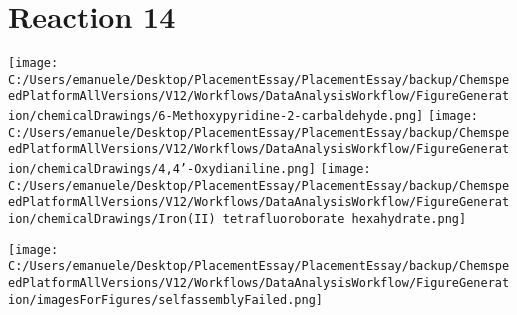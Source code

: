 \documentclass{article}%
\begin{document}
\section*{Reaction 14}%
%
\begin{scheme}[H]%
\begin{minipage}{0.5\textwidth}%
\texttt{[image: C:/Users/emanuele/Desktop/PlacementEssay/PlacementEssay/backup/ChemspeedPlatformAllVersions/V12/Workflows/DataAnalysisWorkflow/FigureGeneration/chemicalDrawings/6-Methoxypyridine-2-carbaldehyde.png]}%
\texttt{[image: C:/Users/emanuele/Desktop/PlacementEssay/PlacementEssay/backup/ChemspeedPlatformAllVersions/V12/Workflows/DataAnalysisWorkflow/FigureGeneration/chemicalDrawings/4,4'-Oxydianiline.png]}%
\texttt{[image: C:/Users/emanuele/Desktop/PlacementEssay/PlacementEssay/backup/ChemspeedPlatformAllVersions/V12/Workflows/DataAnalysisWorkflow/FigureGeneration/chemicalDrawings/Iron(II) tetrafluoroborate hexahydrate.png]}%
\end{minipage}%
\begin{minipage}{0.5\textwidth}%
\begin{center}%
\texttt{[image: C:/Users/emanuele/Desktop/PlacementEssay/PlacementEssay/backup/ChemspeedPlatformAllVersions/V12/Workflows/DataAnalysisWorkflow/FigureGeneration/imagesForFigures/selfassemblyFailed.png]}%
\end{center}%
\end{minipage}%
\caption{Self-assembly of components 6, 15, with Iron(II) in a 3.0:1.5:1.0 molar ratio in CH$_3$CN at 60\textdegree C for 40h. These are the reagents (starting materials) for reaction 14.}%
\end{scheme}%
\end{document}
